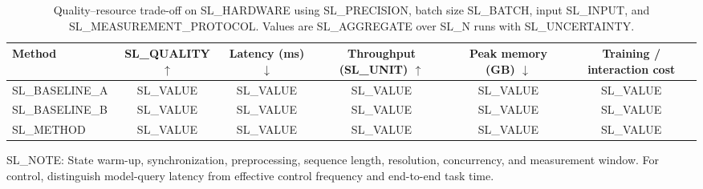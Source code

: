 \begin{table}[t]
  \centering
  \small
  \caption{Quality--resource trade-off on SL_HARDWARE using SL_PRECISION,
  batch size SL_BATCH, input SL_INPUT, and SL_MEASUREMENT_PROTOCOL. Values are
  SL_AGGREGATE over SL_N runs with SL_UNCERTAINTY.}
  \label{tab:SL_LABEL}
  \begin{tabular}{lccccc}
    \toprule
    Method & SL_QUALITY $\uparrow$ & Latency (ms) $\downarrow$ &
    Throughput (SL_UNIT) $\uparrow$ & Peak memory (GB) $\downarrow$ &
    Training / interaction cost \\
    \midrule
    SL_BASELINE_A & SL_VALUE & SL_VALUE & SL_VALUE & SL_VALUE & SL_VALUE \\
    SL_BASELINE_B & SL_VALUE & SL_VALUE & SL_VALUE & SL_VALUE & SL_VALUE \\
    SL_METHOD     & SL_VALUE & SL_VALUE & SL_VALUE & SL_VALUE & SL_VALUE \\
    \bottomrule
  \end{tabular}
  \vspace{2pt}

  \parbox{0.98\linewidth}{\footnotesize
  SL_NOTE: State warm-up, synchronization, preprocessing, sequence length,
  resolution, concurrency, and measurement window. For control, distinguish
  model-query latency from effective control frequency and end-to-end task time.}
\end{table}
